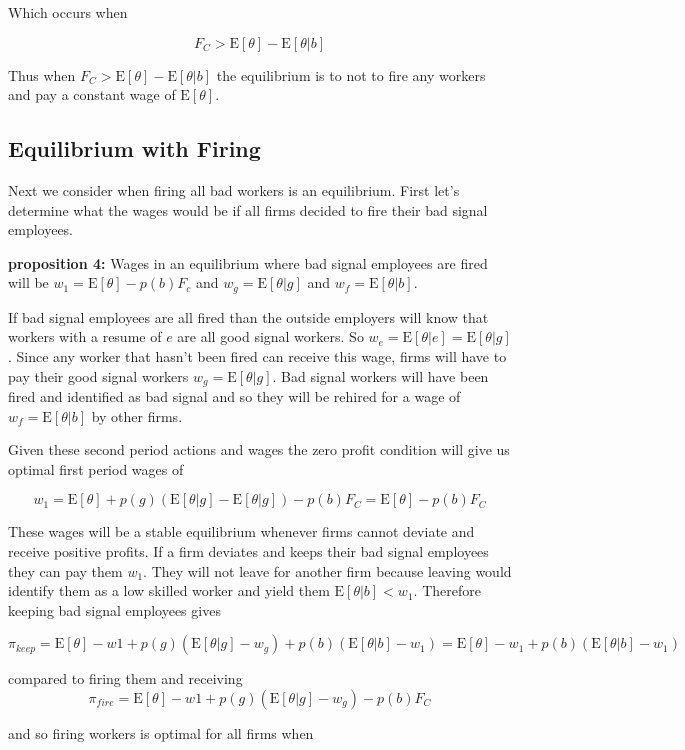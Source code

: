 \documentclass[11pt]{article}
\newcommand{\E}{\mathrm{E}}
\begin{document}
Which occurs when 

$$F_C > \E[\theta] - \E[\theta |b]$$

Thus when  $F_C > \E[\theta] - \E[\theta |b]$ the equilibrium is to not to fire any workers and pay a constant wage of $\E[\theta]$.

\subsection{Equilibrium with Firing}

Next we consider when firing all bad workers is an equilibrium. First let's determine what the wages would be if all firms decided to fire their bad signal employees. 

\textbf{proposition 4:} Wages in an equilibrium where bad signal employees are fired will be $w_1 = \E[\theta] - p(b)F_c$ and $ w_g = \E[\theta|g]$ and $w_f = \E[\theta|b]$. 

If bad signal employees are all fired than the outside employers will know that workers with a resume of $e$ are all good signal workers. So $w_e = \E[\theta|e] = \E[\theta|g]$. Since any worker that hasn't been fired can receive this wage, firms will have to pay their good signal workers $w_g = \E[\theta | g]$. Bad signal workers will have been fired and identified as bad signal and so they will be rehired for a wage of $w_f = \E[\theta | b]$ by other firms. \par

Given these second period actions and wages the zero profit condition will give us optimal first period wages of 

		$$w_1 = \E[\theta] + p(g)(\E[\theta|g] - \E[\theta|g]) - p(b) F_C = \E[\theta] - p(b) F_C$$
		
These wages will be a stable equilibrium whenever firms cannot deviate and receive positive profits. If a firm deviates and keeps their bad signal employees they can pay them $w_1$. They will not leave for another firm because leaving would identify them as a low skilled worker and yield them $\E[\theta|b] < w_1$. Therefore keeping bad signal employees gives 

$$\pi_{keep} = \E[\theta] - w1 + p(g)(\E[\theta|g] - w_g) + p(b)(\E[\theta|b] - w_1 ) = \E[\theta] - w_1 + p(b)(\E[\theta|b] - w_1)$$

compared to firing them and receiving 
$$\pi_{fire} = \E[\theta] - w1 + p(g)(\E[\theta|g] - w_g) - p(b)F_C $$

and so firing workers is optimal for all firms when 
\end{document}
